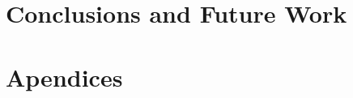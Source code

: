 \documentclass[12pt, titlepage, a4paper]{book}
\begin{document}
\chapter{Conclusions and Future Work}\label{chap:conclusions}



\chapter*{Apendices}




 

% 
% 
\end{document}
